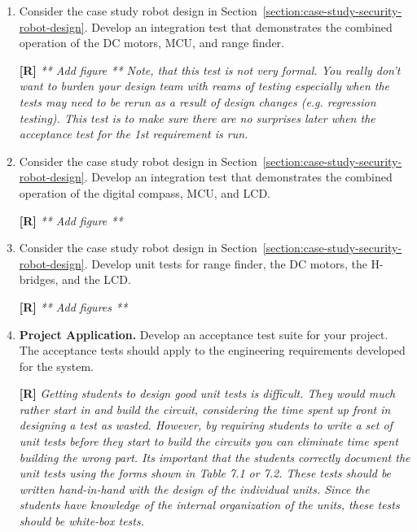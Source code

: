 \begin{enumerate}
\item
  Consider the case study robot design in Section~\ref{section:case-study-security-robot-design}. 
  Develop an
  integration test that demonstrates the combined operation of the DC
  motors, MCU, and range finder.

  \begin{onlysolution}
    \textbf{[R]}
    \itshape
    ** Add figure ** 
    Note, that this test is not very formal. You really don’t want to burden your design team with 
    reams of testing especially when the tests may need to be rerun as a result of design changes 
    (e.g. regression testing). This test is to make sure there are no surprises later when the 
    acceptance test for the 1st requirement is run.
  \end{onlysolution}

\item
  Consider the case study robot design in Section~\ref{section:case-study-security-robot-design}. 
  Develop an
  integration test that demonstrates the combined operation of the
  digital compass, MCU, and LCD.

  \begin{onlysolution}
    \textbf{[R]}
    \itshape
    ** Add figure **
  \end{onlysolution}

\item
  Consider the case study robot design in Section~\ref{section:case-study-security-robot-design}. 
  Develop unit tests for range finder, the DC motors, the H-bridges, and the LCD.

  \begin{onlysolution}
    \textbf{[R]}
    \itshape
    ** Add figures **
  \end{onlysolution}

\item
  \textbf{Project Application.} Develop an acceptance test suite for
  your project. The acceptance tests should apply to the engineering
  requirements developed for the system.

  \begin{onlysolution}
    \textbf{[R]}
    \itshape
    Getting students to design good unit tests is difficult. They would much rather start in 
    and build the circuit, considering the time spent up front in designing a test as wasted. 
    However, by requiring students to write a set of unit tests before they start to build the 
    circuits you can eliminate time spent building the wrong part. Its important that the 
    students correctly document the unit tests using the forms shown in Table 7.1 or 7.2. These 
    tests should be written hand-in-hand with the design of the individual units. Since the students 
    have knowledge of the internal organization of the units, these tests should be white-box tests.
  \end{onlysolution}


\end{enumerate}
